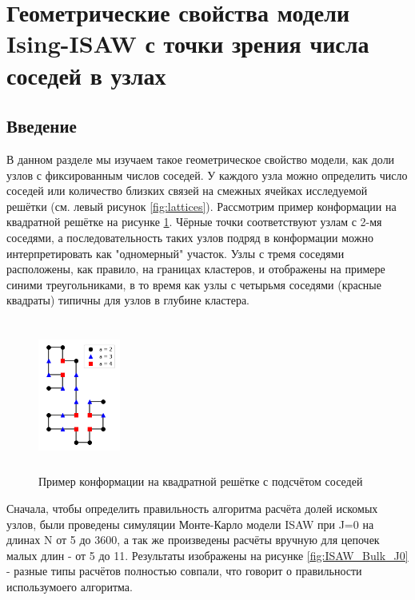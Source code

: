 \section{Геометрические свойства модели Ising-ISAW с точки зрения числа соседей в узлах}

\subsection{Введение}

В данном разделе мы изучаем такое геометрическое свойство модели, как доли узлов с фиксированным числов соседей. У каждого узла можно определить число соседей или количество близких связей на смежных ячейках исследуемой решётки (см. левый рисунок \ref{fig:lattices}). Рассмотрим пример конформации на квадратной решётке на рисунке \ref{fig:example_bulk}. Чёрные точки соответствуют узлам с 2-мя соседями, а последовательность таких узлов подряд в конформации можно интерпретировать как "одномерный" участок. Узлы с тремя соседями расположены, как правило, на границах кластеров, и отображены на примере синими треугольниками, в то время как узлы с четырьмя соседями (красные квадраты) типичны для узлов в глубине кластера.

\begin{figure}
    \centering
    \includegraphics[width=0.24\textwidth, height=5cm]{Sections/Images/update.png}
    \caption{Пример конформации на квадратной решётке с подсчётом соседей}
    \label{fig:example_bulk}
\end{figure}


Сначала, чтобы определить правильность алгоритма расчёта долей искомых узлов, были проведены симуляции Монте-Карло модели ISAW при J=0 на длинах N от 5 до 3600, а так же произведены расчёты вручную для цепочек малых длин - от 5 до 11. Результаты изображены на рисунке \ref{fig:ISAW_Bulk_J0} - разные типы расчётов полностью совпали, что говорит о правильности использумоего алгоритма.

